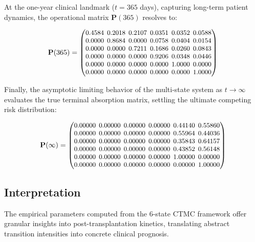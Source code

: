 \documentclass[9pt,a4paper,twocolumn,twoside]{rho-class/rho}
\begin{document}
        At the one-year clinical landmark ($t = 365$ days), capturing long-term patient dynamics, the operational matrix $\mathbf{P}(365)$ resolves to:

        \begin{equation}
        \small
        \setlength{\arraycolsep}{2.2pt}
        \mathbf{P}(365)=
        \begin{pmatrix}
        0.4584 & 0.2018 & 0.2107 & 0.0351 & 0.0352 & 0.0588\\
        0.0000 & 0.8684 & 0.0000 & 0.0758 & 0.0404 & 0.0154\\
        0.0000 & 0.0000 & 0.7211 & 0.1686 & 0.0260 & 0.0843\\
        0.0000 & 0.0000 & 0.0000 & 0.9206 & 0.0348 & 0.0446\\
        0.0000 & 0.0000 & 0.0000 & 0.0000 & 1.0000 & 0.0000\\
        0.0000 & 0.0000 & 0.0000 & 0.0000 & 0.0000 & 1.0000
        \end{pmatrix}
        \end{equation}

        Finally, the asymptotic limiting behavior of the multi-state system as $t \to \infty$ evaluates the true terminal absorption matrix, settling the ultimate competing risk distribution:

        \begin{equation}
        \small
        \setlength{\arraycolsep}{2.2pt}
        \mathbf{P}(\infty)=
        \begin{pmatrix}
        0.00000 & 0.00000 & 0.00000 & 0.00000 & 0.44140 & 0.55860\\
        0.00000 & 0.00000 & 0.00000 & 0.00000 & 0.55964 & 0.44036\\
        0.00000 & 0.00000 & 0.00000 & 0.00000 & 0.35843 & 0.64157\\
        0.00000 & 0.00000 & 0.00000 & 0.00000 & 0.43852 & 0.56148\\
        0.00000 & 0.00000 & 0.00000 & 0.00000 & 1.00000 & 0.00000\\
        0.00000 & 0.00000 & 0.00000 & 0.00000 & 0.00000 & 1.00000
        \end{pmatrix}
        \end{equation}
        
    \subsection{Interpretation}
        The empirical parameters computed from the 6-state CTMC framework offer granular insights into post-transplantation kinetics, translating abstract transition intensities into concrete clinical prognosis.
\end{document}
